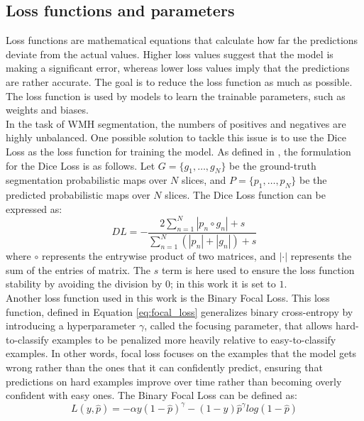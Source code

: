 \documentclass[12pt]{extarticle}
\begin{document}
\subsection{Loss functions and parameters}\label{sec:loss_and_param}
Loss functions are mathematical equations that calculate how far the predictions deviate from the actual values. 
Higher loss values suggest that the model is making a significant error, whereas lower loss values imply that the predictions are rather accurate. 
The goal is to reduce the loss function as much as possible. 
The loss function is used by models to learn the trainable parameters, such as weights and biases.\\[4pt]
In the task of WMH segmentation, the numbers of positives and negatives are highly unbalanced. One possible solution to tackle this issue is to use the Dice Loss as the loss function for training the model. As defined in \cite{fully_conv}, the formulation for the Dice Loss is as follows.
Let $G=\{g_1, \dots, g_N\}$ be the ground-truth segmentation probabilistic maps over $N$ slices, and $P=\{p_1, \dots ,p_N\}$ be the predicted probabilistic maps over $N$ slices. The Dice Loss function can be expressed as:
\begin{equation}
	DL = -\dfrac{2 \sum_{n=1}^N \left| p_n \circ g_n \right| + s}{\sum_{n=1}^N \left( \left| p_n \right| + \left| g_n \right| \right) + s}
\end{equation}
where $\circ$ represents the entrywise product of two matrices, and $\left| \cdot \right|$ represents the sum of the entries of matrix.
The $s$ term is here used to ensure the loss function stability by avoiding the division by $0$; in this work it is set to $1$.\\[4pt]
Another loss function used in this work is the Binary Focal Loss. 
This loss function, defined in Equation \eqref{eq:focal_loss} generalizes binary cross-entropy by introducing a hyperparameter $\gamma$, called the focusing parameter, that allows hard-to-classify examples to be penalized more heavily relative to easy-to-classify examples.
In other words, focal loss focuses on the examples that the model gets wrong rather than the ones that it can confidently predict, ensuring that predictions on hard examples improve over time rather than becoming overly confident with easy ones. The Binary Focal Loss can be defined as:
\begin{equation}
    L(y, \hat{p})= - \alpha y (1-\hat{p})^{\gamma} - (1-y)\hat{p}^{\gamma}log(1-\hat{p})
    \label{eq:focal_loss}
\end{equation}
\end{document}
